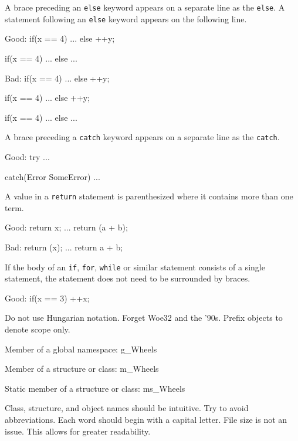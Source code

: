 \item
A brace preceding an {\tt else} keyword appears on a separate line as the {\tt else}. A statement following an {\tt else} keyword appears on the following line. 

Good:
\startCodeExample
if(x == 4)
{
    ...
}
else
  ++y;

if(x == 4)
{
    ...
}
else
{
    ...
}
\stopCodeExample

Bad:
\startCodeExample
if(x == 4) {
    ...
}
else ++y;

if(x == 4) {
    ...
} else ++y;

if(x == 4) {
    ...
}
else {
    ...
}
\stopCodeExample

\item
A brace preceding a {\tt catch} keyword appears on a separate line as the {\tt catch}. 

Good:
\startCodeExample
try
{
    ...
}

catch(Error SomeError)
{
    ...
}
\stopCodeExample

\item
A value in a {\tt return} statement is parenthesized where it contains more than one term.

Good:
\startCodeExample
{
    return x;
}
...
{
    return (a + b);
}
\stopCodeExample

Bad:
\startCodeExample
{
    return (x);
}
...
{
    return a + b;
}
\stopCodeExample

\item
If the body of an {\tt if}, {\tt for}, {\tt while} or similar statement consists of a single statement, the statement does not need to be surrounded by braces.

Good:
\startCodeExample
if(x == 3)
  ++x;
\stopCodeExample

\stopitemize


\startitemize[4]
\item
Do not use Hungarian notation. Forget Woe32 and the '90s. Prefix objects to denote scope only. 

Member of a global namespace:
\startCodeExample
g_Wheels
\stopCodeExample

Member of a structure or class:
\startCodeExample
m_Wheels
\stopCodeExample

Static member of a structure or class:
\startCodeExample
ms_Wheels
\stopCodeExample

\item
Class, structure, and object names should be intuitive. Try to avoid abbreviations. Each word should begin with a capital letter. File size is not an issue. This allows for greater readability.

